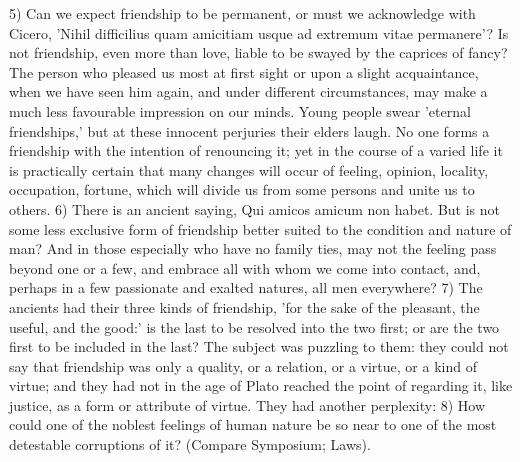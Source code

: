 \documentclass[11pt,letter]{article}
\begin{document}
\par  5) Can we expect friendship to be permanent, or must we acknowledge with Cicero, 'Nihil difficilius quam amicitiam usque ad extremum vitae permanere'? Is not friendship, even more than love, liable to be swayed by the caprices of fancy? The person who pleased us most at first sight or upon a slight acquaintance, when we have seen him again, and under different circumstances, may make a much less favourable impression on our minds. Young people swear 'eternal friendships,' but at these innocent perjuries their elders laugh. No one forms a friendship with the intention of renouncing it; yet in the course of a varied life it is practically certain that many changes will occur of feeling, opinion, locality, occupation, fortune, which will divide us from some persons and unite us to others. 6) There is an ancient saying, Qui amicos amicum non habet. But is not some less exclusive form of friendship better suited to the condition and nature of man? And in those especially who have no family ties, may not the feeling pass beyond one or a few, and embrace all with whom we come into contact, and, perhaps in a few passionate and exalted natures, all men everywhere? 7) The ancients had their three kinds of friendship, 'for the sake of the pleasant, the useful, and the good:' is the last to be resolved into the two first; or are the two first to be included in the last? The subject was puzzling to them: they could not say that friendship was only a quality, or a relation, or a virtue, or a kind of virtue; and they had not in the age of Plato reached the point of regarding it, like justice, as a form or attribute of virtue. They had another perplexity: 8) How could one of the noblest feelings of human nature be so near to one of the most detestable corruptions of it? (Compare Symposium; Laws).
\end{document}
